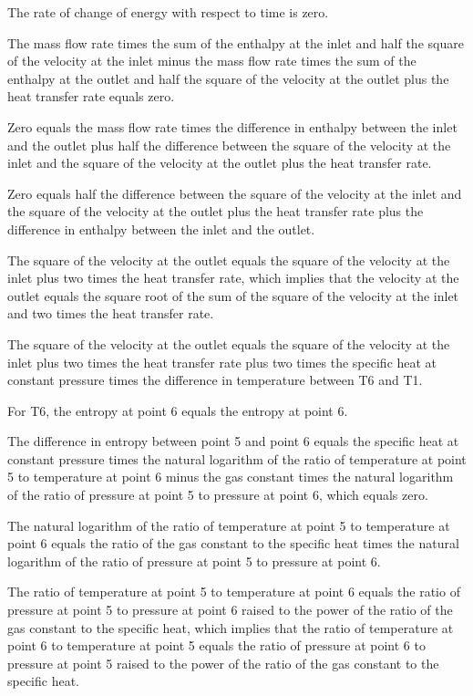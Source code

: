 The rate of change of energy with respect to time is zero.

The mass flow rate times the sum of the enthalpy at the inlet and half the square of the velocity at the inlet minus the mass flow rate times the sum of the enthalpy at the outlet and half the square of the velocity at the outlet plus the heat transfer rate equals zero.

Zero equals the mass flow rate times the difference in enthalpy between the inlet and the outlet plus half the difference between the square of the velocity at the inlet and the square of the velocity at the outlet plus the heat transfer rate.

Zero equals half the difference between the square of the velocity at the inlet and the square of the velocity at the outlet plus the heat transfer rate plus the difference in enthalpy between the inlet and the outlet.

The square of the velocity at the outlet equals the square of the velocity at the inlet plus two times the heat transfer rate, which implies that the velocity at the outlet equals the square root of the sum of the square of the velocity at the inlet and two times the heat transfer rate.

The square of the velocity at the outlet equals the square of the velocity at the inlet plus two times the heat transfer rate plus two times the specific heat at constant pressure times the difference in temperature between T6 and T1.

For T6, the entropy at point 6 equals the entropy at point 6.

The difference in entropy between point 5 and point 6 equals the specific heat at constant pressure times the natural logarithm of the ratio of temperature at point 5 to temperature at point 6 minus the gas constant times the natural logarithm of the ratio of pressure at point 5 to pressure at point 6, which equals zero.

The natural logarithm of the ratio of temperature at point 5 to temperature at point 6 equals the ratio of the gas constant to the specific heat times the natural logarithm of the ratio of pressure at point 5 to pressure at point 6.

The ratio of temperature at point 5 to temperature at point 6 equals the ratio of pressure at point 5 to pressure at point 6 raised to the power of the ratio of the gas constant to the specific heat, which implies that the ratio of temperature at point 6 to temperature at point 5 equals the ratio of pressure at point 6 to pressure at point 5 raised to the power of the ratio of the gas constant to the specific heat.

